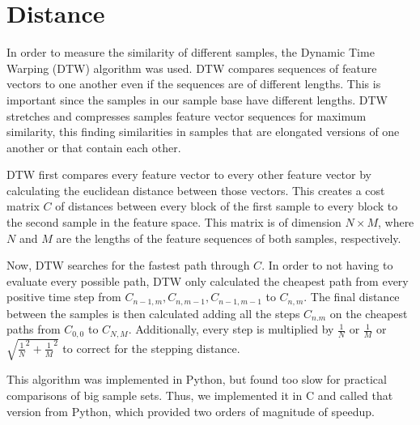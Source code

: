 \section{Distance}
\label{sec:Distance}

In order to measure the similarity of different samples, the Dynamic Time Warping (DTW) algorithm was used. DTW compares sequences of feature vectors to one another even if the sequences are of different lengths. This is important since the samples in our sample base have different lengths. DTW stretches and compresses samples feature vector sequences for maximum similarity, this finding similarities in samples that are elongated versions of one another or that contain each other.

DTW first compares every feature vector to every other feature vector by calculating the euclidean distance between those vectors. This creates a cost matrix $C$ of distances between every block of the first sample to every block to the second sample in the feature space. This matrix is of dimension $N \times M$, where $N$ and $M$ are the lengths of the feature sequences of both samples, respectively.

Now, DTW searches for the fastest path through $C$. In order to not having to evaluate every possible path, DTW only calculated the cheapest path from every positive time step from $C_{n-1,m}, C_{n,m-1}, C_{n-1,m-1}$ to $C_{n,m}$. The final distance between the samples is then calculated adding all the steps $C_{n.m}$ on the cheapest paths from $C_{0,0}$ to $C_{N,M}$. Additionally, every step is multiplied by $\frac{1}{N}$ or $\frac{1}{M}$ or $\sqrt{\frac{1}{N}^2 + \frac{1}{M}^2}$ to correct for the stepping distance.

This algorithm was implemented in Python, but found too slow for practical comparisons of big sample sets. Thus, we implemented it in C and called that version from Python, which provided two orders of magnitude of speedup.
